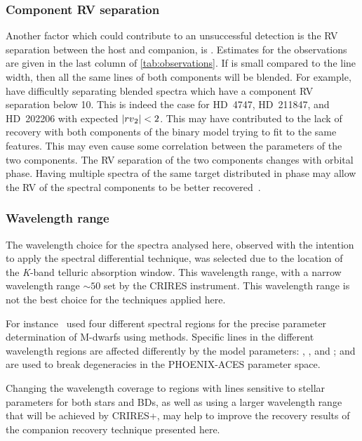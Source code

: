 \subsubsection{Component {RV} separation}
\label{subsubsec:rv_seperation}
Another factor which could contribute to an unsuccessful detection is the {RV} separation between the host and companion, is \Rvtwo{}.
Estimates for the observations are given in the last column of \cref{tab:observations}.
If \Rvtwo{} is small compared to the line width, then all the same lines of both components will be blended.
For example, \citep{kolbl_detection_2015} have difficultly separating blended spectra which have a component {RV} separation below 10\kmps{}.
This is indeed the case for {HD~4747}, {HD~211847}, and {HD~202206} with expected \(|{rv{}}_{2}{}| < 2\)\kmps{}.
This may have contributed to the lack of recovery with both components of the binary model trying to fit to the same features.
This may even cause some correlation between the parameters of the two components.
The {RV} separation of the two components changes with orbital phase.
Having multiple spectra of the same target distributed in phase may allow the {RV} of the spectral components to be better recovered~\citep [e.g.][]{czekala_disentangling_2017, sablowski_spectral_2016, piskorz_evidence_2016}.


\subsubsection {Wavelength range}
\label{subsubsec:wavelenght_range_limitation}
The wavelength choice for the spectra analysed here, observed with the intention to apply the spectral differential technique, was selected due to the location of the \emph{K}-band telluric absorption window.
This wavelength range, with a narrow wavelength range \(\sim50\)\nm{} set by the CRIRES instrument.
This wavelength range is not the best choice for the techniques applied here.

For instance~\citet{passegger_fundamental_2016} used four different spectral regions for the precise parameter determination of M-dwarfs using \textchisquared{} methods.
Specific lines in the different wavelength regions are affected differently by the model parameters: \Teff{}, \Logg{}, and \feh{}; and are used to break degeneracies in the {PHOENIX-ACES} parameter space.

Changing the wavelength coverage to regions with lines sensitive to stellar parameters for both stars and {BD}s, as well as using a larger wavelength range that will be achieved by {CRIRES+}, may help to improve the recovery results of the companion recovery technique presented here.

